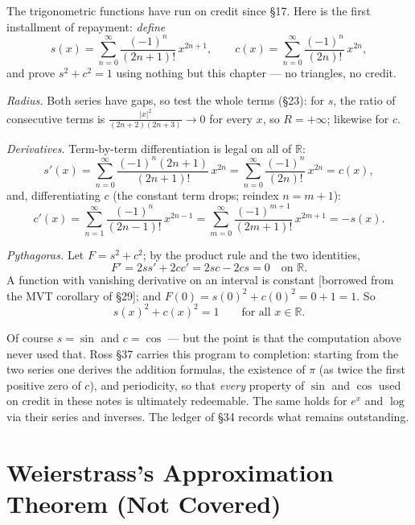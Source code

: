 \documentclass[11pt]{report}
\begin{document}
\begin{exbox}
The trigonometric functions have run on credit since \S 17. Here is the first installment of repayment: \emph{define}
\[
s(x) = \sum_{n=0}^\infty \frac{(-1)^n}{(2n+1)!}\, x^{2n+1}, \qquad
c(x) = \sum_{n=0}^\infty \frac{(-1)^n}{(2n)!}\, x^{2n},
\]
and prove $s^2 + c^2 = 1$ using nothing but this chapter --- no triangles, no credit.

\emph{Radius.} Both series have gaps, so test the whole terms (\S 23): for $s$, the ratio of consecutive terms is $\tfrac{|x|^2}{(2n+2)(2n+3)} \to 0$ for every $x$, so $R = +\infty$; likewise for $c$.

\emph{Derivatives.} Term-by-term differentiation is legal on all of $\mathbb{R}$:
\[
s'(x) = \sum_{n=0}^\infty \frac{(-1)^n (2n+1)}{(2n+1)!}\, x^{2n} = \sum_{n=0}^\infty \frac{(-1)^n}{(2n)!}\, x^{2n} = c(x),
\]
and, differentiating $c$ (the constant term drops; reindex $n = m+1$):
\[
c'(x) = \sum_{n=1}^\infty \frac{(-1)^n}{(2n-1)!}\, x^{2n-1} = \sum_{m=0}^\infty \frac{(-1)^{m+1}}{(2m+1)!}\, x^{2m+1} = -s(x).
\]

\emph{Pythagoras.} Let $F = s^2 + c^2$; by the product rule and the two identities,
\[
F' = 2ss' + 2cc' = 2sc - 2cs = 0 \quad \text{on } \mathbb{R}.
\]
A function with vanishing derivative on an interval is constant [borrowed from the MVT corollary of \S 29]; and $F(0) = s(0)^2 + c(0)^2 = 0 + 1 = 1$. So
\[
s(x)^2 + c(x)^2 = 1 \qquad \text{for all } x \in \mathbb{R}. \tag*{$\blacksquare$}
\]
\end{exbox}

\begin{rembox}
Of course $s = \sin$ and $c = \cos$ --- but the point is that the computation above never used that. Ross \S 37 carries this program to completion: starting from the two series one derives the addition formulas, the existence of $\pi$ (as twice the first positive zero of $c$), and periodicity, so that \emph{every} property of $\sin$ and $\cos$ used on credit in these notes is ultimately redeemable. The same holds for $e^x$ and $\log$ via their series and inverses. The ledger of \S 34 records what remains outstanding.
\end{rembox}


\section{Weierstrass's Approximation Theorem (Not Covered)}
\end{document}
